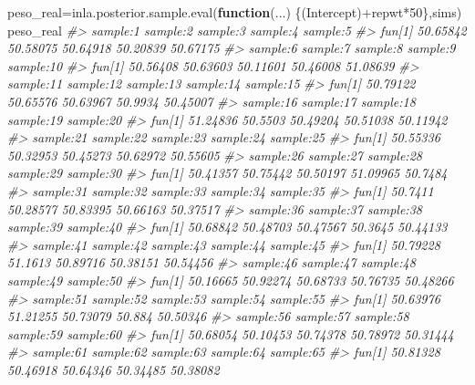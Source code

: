 \documentclass[
]{book}
\newenvironment{Shaded}{\begin{snugshade}}{\end{snugshade}}
\newcommand{\CommentTok}[1]{\textcolor[rgb]{0.56,0.35,0.01}{\textit{#1}}}
\newcommand{\ControlFlowTok}[1]{\textcolor[rgb]{0.13,0.29,0.53}{\textbf{#1}}}
\newcommand{\DecValTok}[1]{\textcolor[rgb]{0.00,0.00,0.81}{#1}}
\newcommand{\FunctionTok}[1]{\textcolor[rgb]{0.00,0.00,0.00}{#1}}
\newcommand{\NormalTok}[1]{#1}
\newcommand{\OtherTok}[1]{\textcolor[rgb]{0.56,0.35,0.01}{#1}}
\newcommand{\SpecialCharTok}[1]{\textcolor[rgb]{0.00,0.00,0.00}{#1}}
\begin{document}
\begin{Shaded}
\begin{Highlighting}[]
\NormalTok{peso\_real}\OtherTok{=}\FunctionTok{inla.posterior.sample.eval}\NormalTok{(}\ControlFlowTok{function}\NormalTok{(...) \{(Intercept)}\SpecialCharTok{+}\NormalTok{repwt}\SpecialCharTok{*}\DecValTok{50}\NormalTok{\},sims)}
\NormalTok{peso\_real}
\CommentTok{\#\textgreater{}        sample:1 sample:2 sample:3 sample:4 sample:5}
\CommentTok{\#\textgreater{} fun[1] 50.65842 50.58075 50.64918 50.20839 50.67175}
\CommentTok{\#\textgreater{}        sample:6 sample:7 sample:8 sample:9 sample:10}
\CommentTok{\#\textgreater{} fun[1] 50.56408 50.63603 50.11601 50.46008  51.08639}
\CommentTok{\#\textgreater{}        sample:11 sample:12 sample:13 sample:14 sample:15}
\CommentTok{\#\textgreater{} fun[1]  50.79122  50.65576  50.63967   50.9934  50.45007}
\CommentTok{\#\textgreater{}        sample:16 sample:17 sample:18 sample:19 sample:20}
\CommentTok{\#\textgreater{} fun[1]  51.24836   50.5503  50.49204  50.51038  50.11942}
\CommentTok{\#\textgreater{}        sample:21 sample:22 sample:23 sample:24 sample:25}
\CommentTok{\#\textgreater{} fun[1]  50.55336  50.32953  50.45273  50.62972  50.55605}
\CommentTok{\#\textgreater{}        sample:26 sample:27 sample:28 sample:29 sample:30}
\CommentTok{\#\textgreater{} fun[1]  50.41357  50.75442  50.50197  51.09965   50.7484}
\CommentTok{\#\textgreater{}        sample:31 sample:32 sample:33 sample:34 sample:35}
\CommentTok{\#\textgreater{} fun[1]   50.7411  50.28577  50.83395  50.66163  50.37517}
\CommentTok{\#\textgreater{}        sample:36 sample:37 sample:38 sample:39 sample:40}
\CommentTok{\#\textgreater{} fun[1]  50.68842  50.48703  50.47567   50.3645  50.44133}
\CommentTok{\#\textgreater{}        sample:41 sample:42 sample:43 sample:44 sample:45}
\CommentTok{\#\textgreater{} fun[1]  50.79228   51.1613  50.89716  50.38151  50.54456}
\CommentTok{\#\textgreater{}        sample:46 sample:47 sample:48 sample:49 sample:50}
\CommentTok{\#\textgreater{} fun[1]  50.16665  50.92274  50.68733  50.76735  50.48266}
\CommentTok{\#\textgreater{}        sample:51 sample:52 sample:53 sample:54 sample:55}
\CommentTok{\#\textgreater{} fun[1]  50.63976  51.21255  50.73079    50.884  50.50346}
\CommentTok{\#\textgreater{}        sample:56 sample:57 sample:58 sample:59 sample:60}
\CommentTok{\#\textgreater{} fun[1]  50.68054  50.10453  50.74378  50.78972  50.31444}
\CommentTok{\#\textgreater{}        sample:61 sample:62 sample:63 sample:64 sample:65}
\CommentTok{\#\textgreater{} fun[1]  50.81328  50.46918  50.64346  50.34485  50.38082}

\end{Highlighting}
\end{Shaded}
\end{document}
